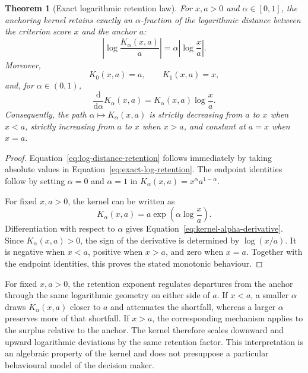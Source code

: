 \documentclass[reqno,11pt]{amsart}
\theoremstyle{definition}
\theoremstyle{plain}
\newtheorem{theorem}{Theorem}
\theoremstyle{remark}
\begin{document}
\begin{theorem}[Exact logarithmic retention law]
For $x,a>0$ and $\alpha\in[0,1]$, the anchoring kernel retains exactly
an $\alpha$-fraction of the logarithmic distance between the criterion
score $x$ and the anchor $a$:
\begin{equation}
\left|
\log
\frac{K_\alpha(x,a)}{a}
\right|
=
\alpha
\left|
\log
\frac{x}{a}
\right|.
\label{eq:log-distance-retention}
\end{equation}
Moreover,
\[
K_0(x,a)=a,
\qquad
K_1(x,a)=x,
\]
and, for $\alpha\in(0,1)$,
\begin{equation}
\frac{\mathrm d}{\mathrm d\alpha}
K_\alpha(x,a)
=
K_\alpha(x,a)
\log\frac{x}{a}.
\label{eq:kernel-alpha-derivative}
\end{equation}
Consequently, the path $\alpha\mapsto K_\alpha(x,a)$ is strictly
decreasing from $a$ to $x$ when $x<a$, strictly increasing from $a$
to $x$ when $x>a$, and constant at $a=x$ when $x=a$.
\end{theorem}

\begin{proof}
Equation~\eqref{eq:log-distance-retention} follows immediately by
taking absolute values in
Equation~\eqref{eq:exact-log-retention}. The endpoint identities follow
by setting $\alpha=0$ and $\alpha=1$ in
$K_\alpha(x,a)=x^\alpha a^{1-\alpha}$.

For fixed $x,a>0$, the kernel can be written as
\[
K_\alpha(x,a)
=
a\exp\left(
\alpha\log\frac{x}{a}
\right).
\]
Differentiation with respect to $\alpha$ gives
Equation~\eqref{eq:kernel-alpha-derivative}. Since
$K_\alpha(x,a)>0$, the sign of the derivative is determined by
$\log(x/a)$. It is negative when $x<a$, positive when $x>a$, and
zero when $x=a$. Together with the endpoint identities, this proves
the stated monotonic behaviour.
\end{proof}

For fixed $x,a>0$, the retention exponent regulates departures from the
anchor through the same logarithmic geometry on either side of $a$. If
$x<a$, a smaller $\alpha$ draws $K_\alpha(x,a)$ closer to $a$ and
attenuates the shortfall, whereas a larger $\alpha$ preserves more of
that shortfall. If $x>a$, the corresponding mechanism applies to the
surplus relative to the anchor. The kernel therefore scales downward
and upward logarithmic deviations by the same retention factor. This
interpretation is an algebraic property of the kernel and does not
presuppose a particular behavioural model of the decision maker.
\end{document}
